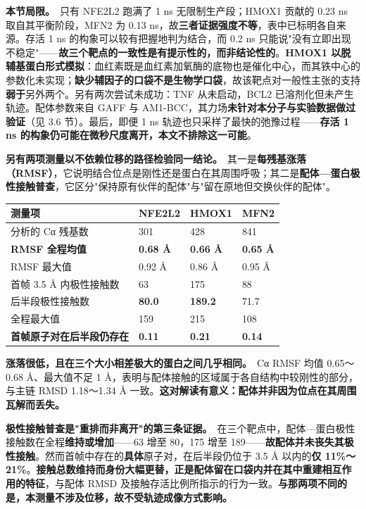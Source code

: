 \documentclass[UTF8,fontset=windows,11pt]{ctexart}
\begin{document}
\textbf{本节局限。}\ 只有 NFE2L2 跑满了 1 ns 无限制生产段；HMOX1 贡献的 0.23 ns 取自其平衡阶段，MFN2 为 0.13 ns，故\textbf{三者证据强度不等}，表中已标明各自来源。存活 1 ns 的构象可以较有把握地判为结合，而 0.2 ns 只能说"没有立即出现不稳定"——\textbf{故三个靶点的一致性是有提示性的，而非结论性的}。\textbf{HMOX1 以脱辅基蛋白形式模拟}：血红素既是血红素加氧酶的底物也是催化中心，而其铁中心的参数化未实现；\textbf{缺少辅因子的口袋不是生物学口袋}，故该靶点对一般性主张的支持\textbf{弱于}另外两个。另有两次尝试未成功：TNF 从未启动，BCL2 已溶剂化但未产生轨迹。配体参数来自 GAFF 与 AM1-BCC，其力场\textbf{未针对本分子与实验数据做过验证}（见 3.6 节）。最后，即便 1 ns 轨迹也只采样了最快的弛豫过程——\textbf{存活 1 ns 的构象仍可能在微秒尺度离开，本文不排除这一可能}。

\textbf{另有两项测量以不依赖位移的路径检验同一结论。}\ 其一是\textbf{每残基涨落（RMSF）}，它说明结合位点是刚性还是蛋白在其周围呼吸；其二是\textbf{配体—蛋白极性接触普查}，它区分"保持原有伙伴的配体"与"留在原地但交换伙伴的配体"。

\begin{center}
\small
\begin{longtable}{p{}p{}p{}p{}}
\hline
测量项 & NFE2L2 & HMOX1 & MFN2 \\
\hline
分析的 Cα 残基数 & 301 & 428 & 841 \\
\textbf{RMSF 全程均值} & \textbf{0.68 Å} & \textbf{0.66 Å} & \textbf{0.65 Å} \\
RMSF 最大值 & 0.92 Å & 0.86 Å & 0.95 Å \\
首帧 3.5 Å 内极性接触数 & 63 & 175 & 88 \\
后半段极性接触数 & \textbf{80.0} & \textbf{189.2} & 71.7 \\
全程最大值 & 159 & 215 & 108 \\
\textbf{首帧原子对在后半段仍存在} & \textbf{0.11} & \textbf{0.21} & \textbf{0.14} \\
\hline
\end{longtable}
\end{center}

\textbf{涨落很低，且在三个大小相差极大的蛋白之间几乎相同。}\ Cα RMSF 均值 0.65～0.68 Å、最大值不足 1 Å，表明与配体接触的区域属于各自结构中较刚性的部分，与主链 RMSD 1.18～1.34 Å 一致。\textbf{这对解读有意义：配体并非因为位点在其周围瓦解而丢失。}

\textbf{极性接触普查是"重排而非离开"的第三条证据。}\ 在三个靶点中，配体—蛋白极性接触数在全程\textbf{维持或增加}——63 增至 80，175 增至 189——\textbf{故配体并未丧失其极性接触}。然而首帧中存在的\textbf{具体}原子对，在后半段仍位于 3.5 Å 以内的\textbf{仅 11\%～21\%}。\textbf{接触总数维持而身份大幅更替，正是配体留在口袋内并在其中重建相互作用的特征}，与配体 RMSD 及接触存活比例所指示的行为一致。\textbf{与那两项不同的是，本测量不涉及位移，故不受轨迹成像方式影响。}
\end{document}
